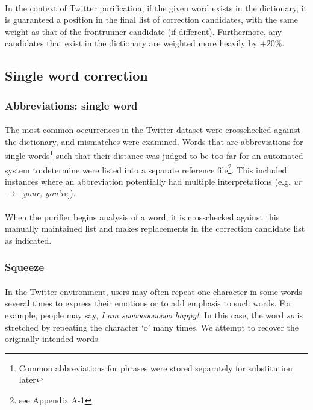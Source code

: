 \documentclass[twocolumn,10pt]{article}
\begin{document}
\paragraph{} In the context of Twitter purification, if the given word exists in the dictionary, it is guaranteed a position in the final list of correction candidates, with the same weight as that of the frontrunner candidate (if different). Furthermore, any candidates that exist in the dictionary are weighted more heavily by $+20\%$.
\subsection*{Single word correction}
\subsubsection*{Abbreviations: single word}
\paragraph{} The most common occurrences in the Twitter dataset were crosschecked against the dictionary, and mismatches were examined. Words that are abbreviations for single words\footnote{Common abbreviations for phrases were stored separately for substitution later} such that their distance was judged to be too far for an automated system to determine were listed into a separate reference file\footnote{see Appendix A-1}. This included instances where an abbreviation potentially had multiple interpretations (e.g. \textit{ur} $\rightarrow$ [\textit{your, you're}]).
\paragraph{} When the purifier begins analysis of a word, it is crosschecked against this manually maintained list and makes replacements in the correction candidate list as indicated.
\subsubsection*{Squeeze}
\paragraph{} In the Twitter environment, users may often repeat one character in some words several times to express their emotions or to add emphasis to such words. For example, people may say, \textit{I am soooooooooooo happy!}. In this case, the word \textit{so} is stretched by repeating the character `o' many times. We attempt to recover the originally intended words.
\end{document}
